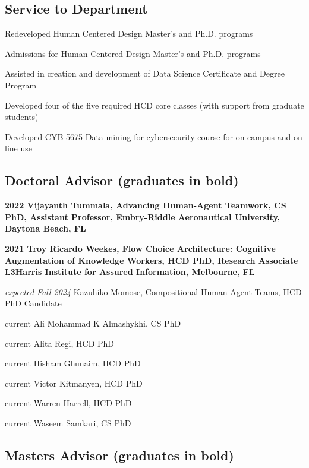 \documentclass[12pt,letterpaper]{report}
\newcommand{\listitemspace}{0.25em}
\renewenvironment{itemize}
{\begin{list}{}{\setlength{\leftmargin}{0em}
                \setlength{\parskip}{0em}
                \setlength{\itemsep}{\listitemspace}
                \setlength{\parsep}{\listitemspace}}}
{\end{list}}
\begin{document}
    \subsection*{Service to Department}

    \begin{itemize}
        \item Redeveloped Human Centered Design Master's and Ph.D. programs
        \item Admissions for Human Centered Design Master's and Ph.D. programs
        \item Assisted in creation and development of Data Science Certificate and Degree Program
        \item Developed four of the five required HCD core classes (with support from graduate students)
        \item Developed CYB 5675  Data mining for cybersecurity course for on campus and on line use
    \end{itemize}

    \subsection*{Doctoral Advisor (graduates in bold)}

    \begin{itemize}
        \item \textbf{2022 Vijayanth Tummala, Advancing Human-Agent Teamwork, CS PhD, Assistant Professor, Embry-Riddle Aeronautical University, Daytona Beach, FL}
        \item \textbf{2021 Troy Ricardo Weekes, Flow Choice Architecture: Cognitive Augmentation of Knowledge Workers, HCD PhD, Research Associate L3Harris Institute for Assured Information, Melbourne, FL}
        \item \textit{expected Fall 2024} Kazuhiko Momose, Compositional Human-Agent Teams, HCD PhD Candidate
        \item current Ali Mohammad K Almashykhi, CS PhD
        \item current Alita Regi, HCD PhD
        \item current Hisham Ghunaim, HCD PhD
        \item current Victor Kitmanyen, HCD PhD
        \item current Warren Harrell, HCD PhD
        \item current Waseem Samkari, CS PhD
    \end{itemize}

    \subsection*{Masters Advisor (graduates in bold)}
\end{document}

